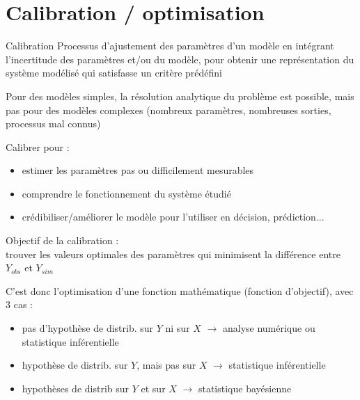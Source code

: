\documentclass[10pt]{beamer}
\begin{document}
\section{Calibration / optimisation}

\begin{frame}

\begin{block}{Calibration}
	Processus d'ajustement des paramètres d'un modèle en intégrant l'incertitude des paramètres et/ou du modèle, pour obtenir une représentation du système modélisé qui satisfasse un critère prédéfini
\end{block}
\bigskip
Pour des modèles simples, la résolution analytique du problème est possible, mais pas pour des modèles complexes (nombreux paramètres, nombreuses sorties, processus mal connus)

\end{frame}

\begin{frame}

Calibrer pour :
\begin{itemize}
	\item estimer les paramètres pas ou difficilement mesurables
	\item comprendre le fonctionnement du système étudié
	\item crédibiliser/améliorer le modèle pour l'utiliser en décision, prédiction...
\end{itemize}
\bigskip
Objectif de la calibration :\\
 trouver les valeurs optimales des paramètres qui minimisent la différence entre $ Y_{obs} $ et $ Y_{sim} $
\bigskip

C'est donc l'optimisation d'une fonction mathématique (fonction d'objectif), avec 3 cas :
\begin{itemize}
	\item pas d'hypothèse de distrib. sur $ Y $ ni sur $ X $ $ \rightarrow $ analyse numérique ou statistique inférentielle
	\item hypothèse de distrib. sur $ Y $, mais pas sur $ X $ $ \rightarrow $ statistique inférentielle
	\item hypothèses de distrib sur $ Y $ et sur $ X $ $ \rightarrow $ statistique bayésienne
\end{itemize}

\end{frame}
\end{document}
